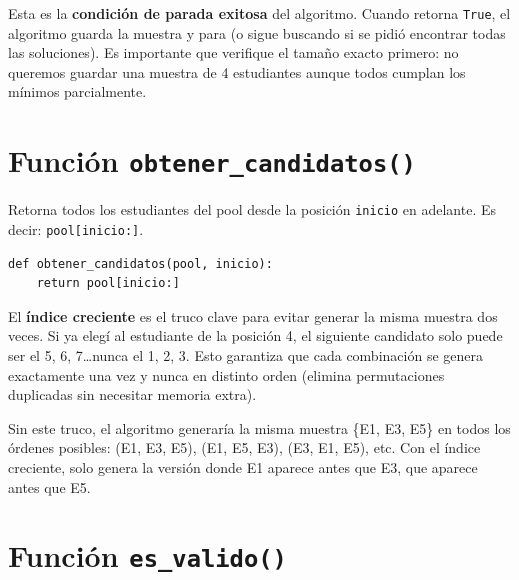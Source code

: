 \documentclass[11pt, a4paper]{article}
\begin{document}
\begin{porqueimporta}
Esta es la \textbf{condición de parada exitosa} del algoritmo. Cuando retorna \texttt{True}, el algoritmo guarda la muestra y para (o sigue buscando si se pidió encontrar todas las soluciones). Es importante que verifique el tamaño exacto primero: no queremos guardar una muestra de 4 estudiantes aunque todos cumplan los mínimos parcialmente.
\end{porqueimporta}

\section{Función \texttt{obtener\_candidatos()}}

\begin{quehaec}
Retorna todos los estudiantes del pool desde la posición \texttt{inicio} en adelante. Es decir: \texttt{pool[inicio:]}.
\end{quehaec}

\begin{lstlisting}[style=python]
def obtener_candidatos(pool, inicio):
    return pool[inicio:]
\end{lstlisting}

\begin{porqueimporta}
El \textbf{índice creciente} es el truco clave para evitar generar la misma muestra dos veces. Si ya elegí al estudiante de la posición 4, el siguiente candidato solo puede ser el 5, 6, 7\ldots nunca el 1, 2, 3. Esto garantiza que cada combinación se genera exactamente una vez y nunca en distinto orden (elimina permutaciones duplicadas sin necesitar memoria extra).

\medskip
Sin este truco, el algoritmo generaría la misma muestra \{E1, E3, E5\} en todos los órdenes posibles: (E1, E3, E5), (E1, E5, E3), (E3, E1, E5), etc. Con el índice creciente, solo genera la versión donde E1 aparece antes que E3, que aparece antes que E5.
\end{porqueimporta}

\section{Función \texttt{es\_valido()}}
\end{document}
